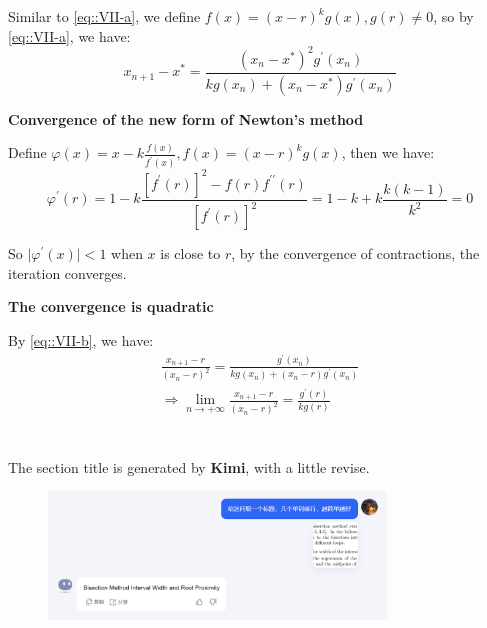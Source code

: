 \documentclass[a4paper]{article}
\begin{document}
Similar to \ref{eq::VII-a}, we define $f(x) = (x-r)^k g(x), g(r) \ne 0$, so by \ref{eq::VII-a}, we have:
\begin{equation}
  x_{n+1} - x^* = \frac{(x_n - x^*)^2 g^\prime(x_n)}{k g(x_n) + (x_n-x^*) g^\prime(x_n)}
  \label{eq::VII-b}
\end{equation}

\textbf{Convergence of the new form of Newton's method}

Define $\varphi(x) = x - k \frac{f(x)}{f^\prime(x)}, f(x) = (x-r)^k g(x)$, then we have:
\begin{equation}
  \varphi^\prime (r) = 1 - k \frac{[f^\prime (r)]^2 - f(r)f^{\prime \prime}(r)}{[f^\prime (r)]^2} = 1-k + k \frac{k(k-1)}{k^2} = 0
\end{equation}

So $\vert \varphi^\prime (x) \vert < 1$ when $x$ is close to $r$, by the convergence of contractions, the iteration converges. 

\textbf{The convergence is quadratic}

By \ref{eq::VII-b}, we have:
\begin{equation}
  \begin{aligned}
    \frac{x_{n+1} - r}{(x_n - r)^2} = \frac{ g^\prime(x_n)}{k g(x_n) + (x_n-r) g^\prime(x_n)}\\
    \Rightarrow \lim_{n \rightarrow +\infty} \frac{x_{n+1} - r}{(x_n - r)^2} = \frac{g^\prime(r)}{k g(r)}
  \end{aligned}
\end{equation}

\section*{  }
The section title is generated by \textbf{Kimi}, with a little revise. 
\begin{figure}[H]
  \begin{center}
    \includegraphics[width=0.8\textwidth]{./figure/kimi.png}
  \end{center}
\end{figure}

\printbibliography
\end{document}
